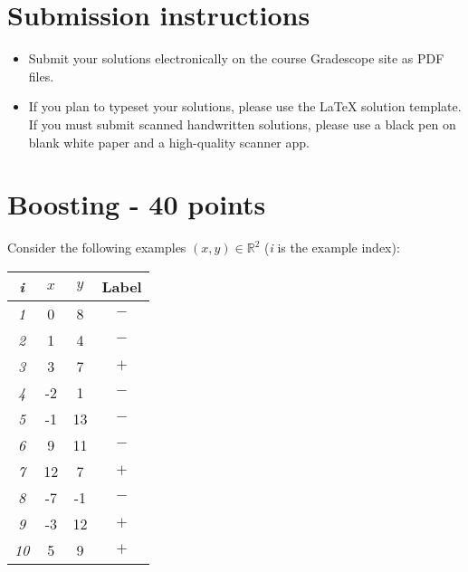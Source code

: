 \documentclass[11pt]{article}
\begin{document}
\author{}
\date{}
\maketitle
\vspace{-0.75in}

\vspace{-11pt}

\ifsoln
\else
\section*{Submission instructions}
\begin{itemize}
\item 
Submit your solutions electronically on the course Gradescope site as PDF files.
\item If you plan to typeset your solutions, please use the LaTeX solution template. If you must submit scanned handwritten solutions, please use a black pen on blank white paper and a high-quality scanner app.

\end{itemize}
\fi


\section {Boosting - 40 points}
  Consider the following examples $(x,y) \in \mathbb{R}^2$ ({\em i} is the example index):
  \begin{center}
    \begin{tabular}{|c|c|c|c|}
      \hline
      {\em i}  & $x$  & $y$ & Label \\
      \hline
      {\em 1}  & 0  & 8 & $-$ \\
      \hline
      {\em 2}  & 1  & 4 & $-$ \\
      \hline
      {\em 3}  & 3  & 7 & $+$ \\
      \hline
      {\em 4}  & -2  & 1 & $-$ \\
      \hline
      {\em 5}  & -1  & 13 & $-$ \\
      \hline
      {\em 6}  & 9  & 11 & $-$ \\
      \hline
      {\em 7}  & 12 & 7 & $+$ \\
      \hline
      {\em 8}  & -7  & -1 & $-$ \\
      \hline
      {\em 9}  & -3  & 12 & $+$ \\
      \hline
      {\em 10} & 5  & 9 & $+$ \\
      \hline
    \end{tabular}
  \end{center}
\end{document}
